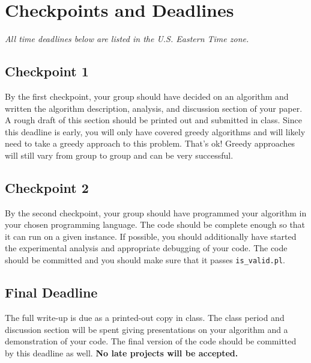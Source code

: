 \documentclass[12pt]{article}
\begin{document}
\section{Checkpoints and Deadlines}
\emph{All time deadlines below are listed in the U.S. Eastern Time zone.}

\subsection{Checkpoint 1}
By the first checkpoint, your group should have decided on an algorithm and written the algorithm description, analysis, and discussion section of your paper. A rough draft of this section should be printed out and submitted in class.  Since this deadline is early, you will only have covered greedy algorithms and will likely need to take a greedy approach to this problem.  That's ok!  Greedy approaches will still vary from group to group and can be very successful.

\subsection{Checkpoint 2}
By the second checkpoint, your group should have programmed your algorithm in your chosen programming language. The code should be complete enough so that it can run on a given instance. If possible, you should additionally have started the experimental analysis and appropriate debugging of your code. The code should be committed and you should make sure that it passes \texttt{is\_valid.pl}.

\subsection{Final Deadline}
The full write-up is due as a printed-out copy in class. The class period and discussion section will be spent giving presentations on your algorithm and a demonstration of your code. The final version of the code should be committed by this deadline as well. \textbf{No late projects will be accepted.}
\end{document}
